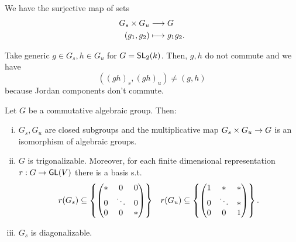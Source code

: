 We have the surjective map of sets
\begin{align*}
G_s \times G_u & \overset{}{\longrightarrow} G\\
(g_1, g_2) & \longmapsto g_1g_2.
\end{align*}
\begin{example}
Take generic $g \in G_s, h \in G_u$ for $G=\textsf{SL}_2(k)$. Then, $g,h$ do not commute and we have
\[ ((gh)_s, (gh)_u) \neq (g, h) \]
because Jordan components don't commute.
\end{example}
\begin{theorem}
Let $G$ be a commutative algebraic group. Then:
\begin{enumerate}[(i)]
	\item $G_s, G_u$ are closed subgroups and the multiplicative map $G_s \times G_u \overset{}{\rightarrow} G$ is an isomorphism of algebraic groups.
	\item $G$ is trigonalizable. Moreover, for each finite dimensional representation $r : G \overset{}{\rightarrow} \textsf{GL}(V)$ there is a basis s.t.
	\begin{align*}
	r(G_s) \subseteq \left\lbrace\left(\begin{matrix} * & 0& 0\\
	0 & \ddots & 0\\
0 & 0 & * \end{matrix}\right)\right\rbrace && 
	r(G_u) \subseteq \left\lbrace\left(\begin{matrix} 1 & * & *\\
		0 & \ddots & *\\
		0 & 0 & 1 \end{matrix}\right)\right\rbrace.
	\end{align*}
	\item $G_s$ is diagonalizable.
\end{enumerate}
\end{theorem}
